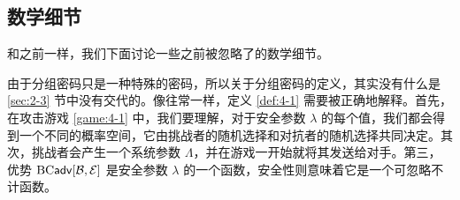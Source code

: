 \subsection{数学细节}

和之前一样，我们下面讨论一些之前被忽略了的数学细节。

由于分组密码只是一种特殊的密码，所以关于分组密码的定义，其实没有什么是 \ref{sec:2-3} 节中没有交代的。像往常一样，定义 \ref{def:4-1} 需要被正确地解释。首先，在攻击游戏 \ref{game:4-1} 中，我们要理解，对于安全参数 $\lambda$ 的每个值，我们都会得到一个不同的概率空间，它由挑战者的随机选择和对抗者的随机选择共同决定。其次，挑战者会产生一个系统参数 $\Lambda$，并在游戏一开始就将其发送给对手。第三，优势 ${\rm BC\mathsf{adv}}[\mathcal{B},\mathcal{E}]$ 是安全参数 $\lambda$ 的一个函数，安全性则意味着它是一个可忽略不计函数。
